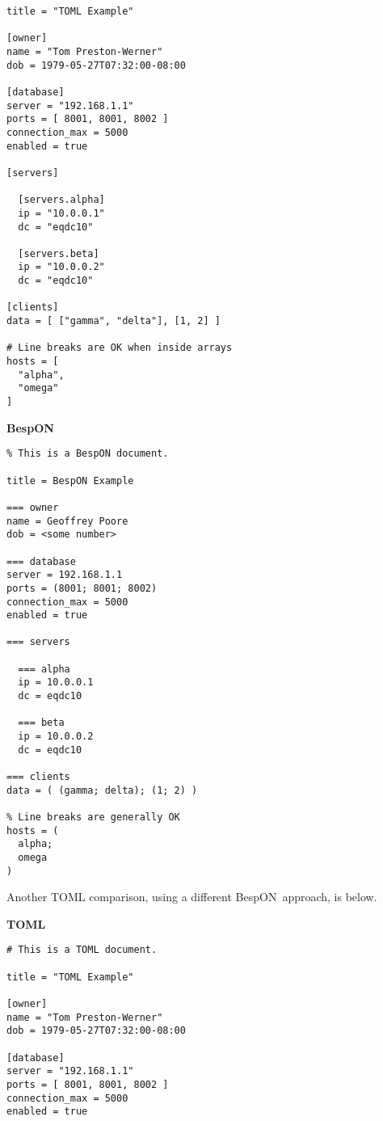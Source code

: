 \documentclass[11pt]{article}
\newcommand{\bespon}{BespON}
\begin{document}
\begin{appendices}
\begin{tcolorbox}{}
\begin{multicols}{2}
\begin{Verbatim}[formatcom=\color{DarkGreen}]
title = "TOML Example"

[owner]
name = "Tom Preston-Werner"
dob = 1979-05-27T07:32:00-08:00

[database]
server = "192.168.1.1"
ports = [ 8001, 8001, 8002 ]
connection_max = 5000
enabled = true

[servers]

  [servers.alpha]
  ip = "10.0.0.1"
  dc = "eqdc10"

  [servers.beta]
  ip = "10.0.0.2"
  dc = "eqdc10"

[clients]
data = [ ["gamma", "delta"], [1, 2] ]

# Line breaks are OK when inside arrays
hosts = [
  "alpha",
  "omega"
]
\end{Verbatim}
\columnbreak
\centering \textbf{BespON}

\begin{Verbatim}
% This is a BespON document.

title = BespON Example

=== owner
name = Geoffrey Poore
dob = <some number>

=== database
server = 192.168.1.1
ports = (8001; 8001; 8002)
connection_max = 5000
enabled = true

=== servers

  === alpha
  ip = 10.0.0.1
  dc = eqdc10

  === beta
  ip = 10.0.0.2
  dc = eqdc10

=== clients
data = ( (gamma; delta); (1; 2) )

% Line breaks are generally OK
hosts = (
  alpha;
  omega
)
\end{Verbatim}
\end{multicols}
\end{tcolorbox}


Another TOML comparison, using a different \bespon\ approach, is below.

\begin{tcolorbox}{}
\begin{multicols}{2}

\centering \textbf{TOML}
\begin{Verbatim}[formatcom=\color{DarkGreen}]
# This is a TOML document.

title = "TOML Example"

[owner]
name = "Tom Preston-Werner"
dob = 1979-05-27T07:32:00-08:00

[database]
server = "192.168.1.1"
ports = [ 8001, 8001, 8002 ]
connection_max = 5000
enabled = true


\end{Verbatim}
\end{multicols}
\end{tcolorbox}
\end{appendices}
\end{document}
